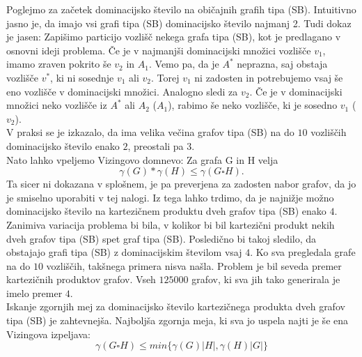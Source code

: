 \documentclass{article}
\begin{document}
Poglejmo za začetek dominacijsko število na običajnih grafih tipa (SB).
Intuitivno jasno je, da imajo vsi grafi tipa (SB) dominacijsko število najmanj 2. Tudi dokaz je jasen:
Zapišimo particijo vozlišč nekega grafa tipa (SB), kot je predlagano v osnovni ideji problema.
Če je v najmanjši dominacijski množici vozlišče $v_1$, imamo zraven pokrito še $v_2$ in 
$A_1$. Vemo pa, da je $A^*$ neprazna, saj obstaja vozlišče $v^*$, ki ni 
sosednje $v_1$ ali $v_2$. Torej $v_1$ ni zadosten in potrebujemo vsaj še eno vozlišče v dominacijski množici.
Analogno sledi za $v_2$. Če je v dominacijski množici neko vozlišče iz $A^*$ ali $A_2$ ($A_1$), rabimo še neko
vozlišče, ki je sosedno $v_1$ ($v_2$). 
\\
V praksi se je izkazalo, da ima velika večina grafov tipa (SB) na do $10$
vozliščih dominacijsko število enako $2$, preostali pa $3$. 
\\
Nato lahko vpeljemo Vizingovo domnevo: Za grafa G in H velja
$$ \gamma(G)*\gamma(H) \leq \gamma(G\square H). $$
Ta sicer ni dokazana v splošnem, je pa preverjena za zadosten nabor grafov, da jo je smiselno uporabiti v 
tej nalogi.
Iz tega lahko trdimo, da je najnižje možno dominacijsko število na 
kartezičnem produktu dveh grafov tipa (SB) enako $4$. 
\\
Zanimiva variacija problema bi bila, v kolikor bi bil kartezični produkt nekih
dveh grafov tipa (SB) spet graf tipa (SB). Posledično bi takoj sledilo, da obstajajo 
grafi tipa (SB) z dominacijskim številom vsaj $4$. Ko sva pregledala grafe na do $10$ vozliščih, 
takšnega primera nisva našla. Problem je bil seveda premer kartezičnih produktov grafov. Vseh $125000$ grafov, ki 
sva jih tako generirala je imelo premer $4$.
\\
Iskanje zgornjih mej za dominacijsko število kartezičnega produkta dveh grafov tipa (SB) je zahtevnejša.
Najboljša zgornja meja, ki sva jo uspela najti je še ena Vizingova izpeljava:
$$ \gamma(G\square H) \leq min\{\gamma(G)\lvert H \rvert, \gamma(H)\lvert G \rvert\}$$
\end{document}
